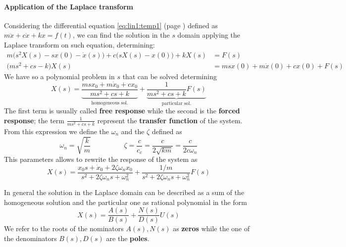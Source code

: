 		\paragraph{Application of the Laplace transform} Considering the differential equation \ref{eq:lin1:temp1} (page \pageref{eq:lin1:temp1}) defined as $m\ddot x + c\dot x + kx = f(t)$, we can find the solution in the $s$ domain applying the Laplace transform on such equation, determining:
		\begin{align*}
			m\big(s^2 X(s) - s x(0) - \dot x(s)\big) + c \big(sX(s) - x(0)\big) + kX(s) & = F(s) \\
			\big(ms^2 + cs - k\big)X(s) & = msx(0) + m\dot x(0) + cx(0) + F(s)
		\end{align*}
		We have so a polynomial problem in $s$ that can be solved determining
		\[ X(s) = \underbrace{\frac{msx_0+ m\dot x_0 + cx_0}{ms^2 + cs + k}}_\textrm{homogeneous sol.} + \underbrace{\frac{1}{ms^2 + cs + k}F(s)}_\textrm{particular sol.} \]
		The first term is usually called \textbf{free response} while the second is the \textbf{forced response}; the term $\frac{1}{ms^2 + cs + k} $ represent the \textbf{transfer function} of the system. From this expression we define the  $\omega_n$ and the  $\zeta$ defined as
		\begin{equation}
			\omega_n = \sqrt{ \frac k m} \hspace{2cm} \zeta =\frac{c}{c_c} = \frac{c}{2\sqrt{km}} = \frac{c}{2c \omega_n}
		\end{equation}
		This parameters allows to rewrite the response of the system as
		\begin{equation} \label{eq:lin1:temp2}
			X(s) = \frac{x_0s + \dot x_0 + 2 \zeta \omega_n x_0}{s^2 + 2 \zeta\omega_ns + \omega_n^2} + \frac{1/m}{s^2 + 2 \zeta \omega_n s + \omega_n^2} F(s)
		\end{equation}
		
		In general the solution in the Laplace domain can be described as a sum of the homogeneous solution and the particular one as rational polynomial in the form
		\[ X(s) = \frac{A(s)}{B(s)} + \frac{N(s)}{D(s)} U(s) \]
		We refer to the roots of the nominators $A(s),N(s)$ as \textbf{zeros} while the one of the denominators $B(s),D(s)$ are the \textbf{poles}.
	
